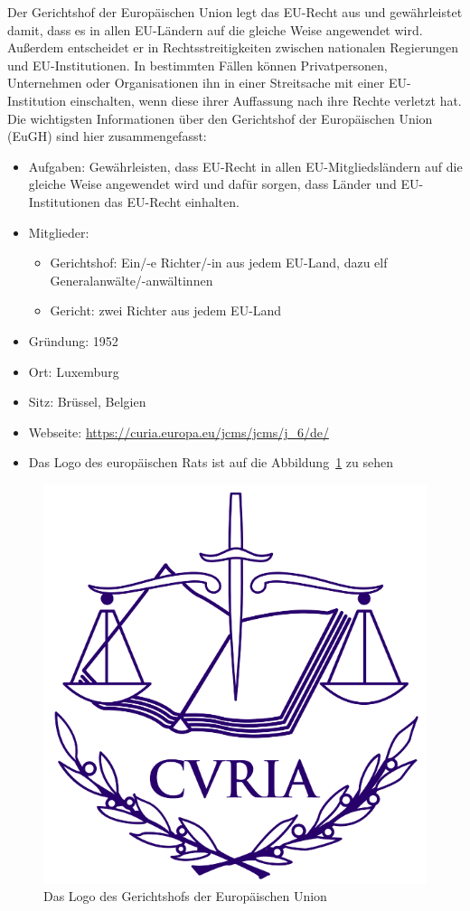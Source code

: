 Der Gerichtshof der Europäischen Union legt das EU-Recht aus und gewährleistet damit, dass es in allen EU-Ländern auf die gleiche Weise angewendet wird. Außerdem entscheidet er in Rechtsstreitigkeiten zwischen nationalen Regierungen und EU-Institutionen.\newline
In bestimmten Fällen können Privatpersonen, Unternehmen oder Organisationen ihn in einer Streitsache mit einer EU-Institution einschalten, wenn diese ihrer Auffassung nach ihre Rechte verletzt hat.\newline
Die wichtigsten Informationen über den Gerichtshof der Europäischen Union (EuGH) sind hier zusammengefasst:
\begin{itemize}
  \item Aufgaben: Gewährleisten, dass EU-Recht in allen EU-Mitgliedsländern auf die gleiche Weise angewendet wird und dafür sorgen, dass Länder und EU-Institutionen das EU-Recht einhalten.
  \item Mitglieder:
  \begin{itemize}
    \item Gerichtshof: Ein/-e Richter/-in aus jedem EU-Land, dazu elf Generalanwälte/-anwältinnen
    \item Gericht: zwei Richter aus jedem EU-Land
  \end{itemize}
  \item Gründung: 1952
  \item Ort: Luxemburg
  \item Sitz: Brüssel, Belgien
  \item Webseite: \url{https://curia.europa.eu/jcms/jcms/j_6/de/}
  \item Das Logo des europäischen Rats ist auf die Abbildung~\ref{fig:logoEuroGerichtshof} zu sehen
\end{itemize}

\begin{figure}[H]
\centering
    \includegraphics[width=.5\textwidth]{images/Euro_Gerichtshof.png}
    \caption{Das Logo des Gerichtshofs der Europäischen Union}
    \label{fig:logoEuroGerichtshof}
\end{figure}

